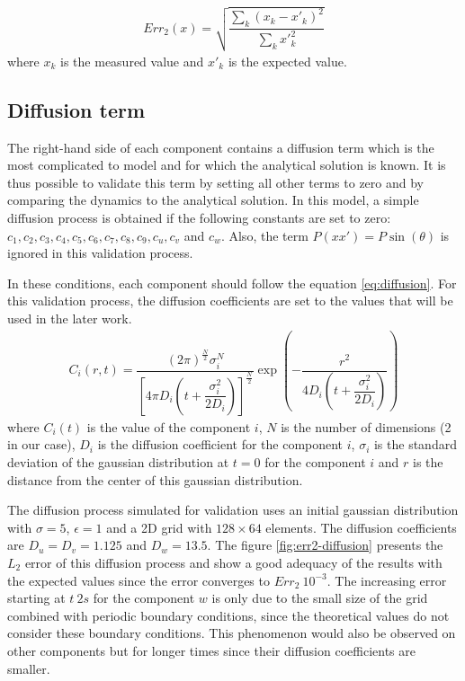 \documentclass[a4paper]{article}
\begin{document}
\begin{align}
\label{eq:l2-error}
	Err_2(x)= \sqrt{\dfrac{\sum_k \left( x_k - x'_k \right)^2}{\sum_k x'^2_k}}
\end{align}
where $x_k$ is the measured value and $x'_k$ is the expected value.

\subsection{Diffusion term}
\label{ssec:diffusion}

The right-hand side of each component contains a diffusion term which is the most complicated to model and for which the analytical solution is known. It is thus possible to validate this term by setting all other terms to zero and by comparing the dynamics to the analytical solution. In this model, a simple diffusion process is obtained if the following constants are set to zero: $c_1, c_2, c_3, c_4, c_5, c_6, c_7, c_8, c_9, c_u, c_v$ and $c_w$.
Also, the term $P(xx') = P \sin (\theta)$ is ignored in this validation process.

In these conditions, each component should follow the equation \ref{eq:diffusion}. For this validation process, the diffusion coefficients are set to the values that will be used in the later work.
\begin{align}
\label{eq:diffusion}
	C_i(r, t)= \dfrac{ \left( 2 \pi \right) ^\frac{N}{2} \sigma^N_i }{ \left[ 4 \pi D_i \left( t + \dfrac{\sigma^2_i}{2D_i} \right) \right]^\frac{N}{2} } \exp \left(- \dfrac{r^2}{4 D_i \left ( t + \dfrac{\sigma^2_i}{2D_i} \right) } \right)
\end{align}
where $C_i(t)$ is the value of the component $i$, $N$ is the number of dimensions (2 in our case), $D_i$ is the diffusion coefficient for the component $i$, $\sigma_i$ is the standard deviation of the gaussian distribution at $t=0$ for the component $i$ and $r$ is the distance from the center of this gaussian distribution.

The diffusion process simulated for validation uses an initial gaussian distribution with $\sigma = 5$, $\epsilon = 1$ and a 2D grid with $128 \times 64$ elements. The diffusion coefficients are $D_u = D_v = 1.125$ and $D_w = 13.5$. The figure \ref{fig:err2-diffusion} presents the $L_2$ error of this diffusion process and show a good adequacy of the results with the expected values since the error converges to $Err_2 ~ 10^{-3}$. The increasing error starting at $t~2s$ for the component $w$ is only due to the small size of the grid combined with periodic boundary conditions, since the theoretical values do not consider these boundary conditions. This phenomenon would also be observed on other components but for longer times since their diffusion coefficients are smaller.
\end{document}
